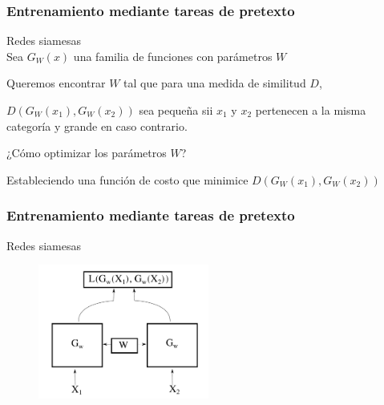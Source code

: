 \documentclass{beamer}
\begin{document}
\begin{frame}
\frametitle{Entrenamiento mediante tareas de pretexto}
Redes siamesas\\
\vfill
Sea \(G_W(x)\) una familia de funciones con parámetros \(W\)\\
\vfill
	
Queremos encontrar \(W\) tal que para una medida de similitud \(D\),\\

\vfill
	
\(D(G_W(x_1), G_W(x_2))\) sea pequeña sii \(x_1\) y \(x_2\) pertenecen a la misma categoría y
grande en caso contrario.\pause 
\vfill
	
	
¿Cómo optimizar los parámetros \(W\)?\\\pause
\vfill

Estableciendo una función de costo que minimice \(D(G_W(x_1), G_W(x_2))\)
\end{frame}





\begin{frame}
\frametitle{Entrenamiento mediante tareas de pretexto}
Redes siamesas\\
\begin{figure}
    \centering
    \includegraphics[width=0.5\textwidth]{images/siamese-diagram.pdf}
\end{figure}
\end{frame}
\end{document}

